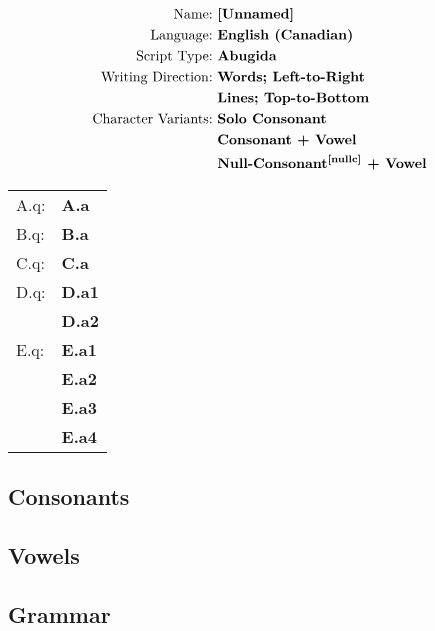 \label{AbR}
\newpage
\begin{align*}
\text{Name:}~               & \textbf{[Unnamed]}                      \\
\text{Language:}~           & \textbf{English~(Canadian)}             \\
\text{Script Type:}~        & \textbf{Abugida}                        \\
\text{Writing Direction:}~  & \textbf{Words;~Left-to-Right}           \\
                            & \textbf{Lines;~Top-to-Bottom}           \\
\text{Character Variants:}~ & \textbf{Solo~Consonant}                 \\
                            & \textbf{Consonant~+~Vowel}              \\
                            & \textbf{\super{Null-Consonant}{\cite{nullc}}~+~Vowel}%
\end{align*}

\begin{tabular}{@{}l l@{}}
A.q: & \textbf{A.a}    \\
B.q: & \textbf{B.a}    \\
C.q: & \textbf{C.a}    \\
D.q: & \textbf{D.a1}   \\
             & \textbf{D.a2}   \\
E.q: & \textbf{E.a1}   \\
             & \textbf{E.a2}   \\
             & \textbf{E.a3}   \\
             & \textbf{E.a4}   \\
\end{tabular}


\newpage
\subsection{Consonants}


\newpage
\subsection{Vowels}


\newpage
\subsection{Grammar}
